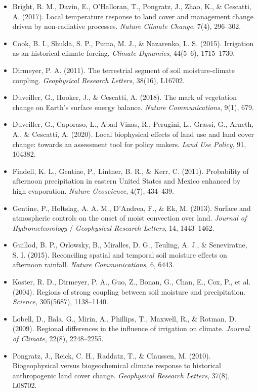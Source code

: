 \begin{itemize}
\item Bright, R. M., Davin, E., O'Halloran, T., Pongratz, J., Zhao, K., \& Cescatti, A. (2017). Local temperature response to land cover and management change driven by non-radiative processes. \textit{Nature Climate Change}, 7(4), 296--302.
\item Cook, B. I., Shukla, S. P., Puma, M. J., \& Nazarenko, L. S. (2015). Irrigation as an historical climate forcing. \textit{Climate Dynamics}, 44(5--6), 1715--1730.
\item Dirmeyer, P. A. (2011). The terrestrial segment of soil moisture-climate coupling. \textit{Geophysical Research Letters}, 38(16), L16702.
\item Duveiller, G., Hooker, J., \& Cescatti, A. (2018). The mark of vegetation change on Earth's surface energy balance. \textit{Nature Communications}, 9(1), 679.
\item Duveiller, G., Caporaso, L., Abad-Vinas, R., Perugini, L., Grassi, G., Arneth, A., \& Cescatti, A. (2020). Local biophysical effects of land use and land cover change: towards an assessment tool for policy makers. \textit{Land Use Policy}, 91, 104382.
\item Findell, K. L., Gentine, P., Lintner, B. R., \& Kerr, C. (2011). Probability of afternoon precipitation in eastern United States and Mexico enhanced by high evaporation. \textit{Nature Geoscience}, 4(7), 434--439.
\item Gentine, P., Holtslag, A. A. M., D'Andrea, F., \& Ek, M. (2013). Surface and atmospheric controls on the onset of moist convection over land. \textit{Journal of Hydrometeorology} / \textit{Geophysical Research Letters}, 14, 1443--1462.
\item Guillod, B. P., Orlowsky, B., Miralles, D. G., Teuling, A. J., \& Seneviratne, S. I. (2015). Reconciling spatial and temporal soil moisture effects on afternoon rainfall. \textit{Nature Communications}, 6, 6443.
\item Koster, R. D., Dirmeyer, P. A., Guo, Z., Bonan, G., Chan, E., Cox, P., et al. (2004). Regions of strong coupling between soil moisture and precipitation. \textit{Science}, 305(5687), 1138--1140.
\item Lobell, D., Bala, G., Mirin, A., Phillips, T., Maxwell, R., \& Rotman, D. (2009). Regional differences in the influence of irrigation on climate. \textit{Journal of Climate}, 22(8), 2248--2255.
\item Pongratz, J., Reick, C. H., Raddatz, T., \& Claussen, M. (2010). Biogeophysical versus biogeochemical climate response to historical anthropogenic land cover change. \textit{Geophysical Research Letters}, 37(8), L08702.

\end{itemize}
